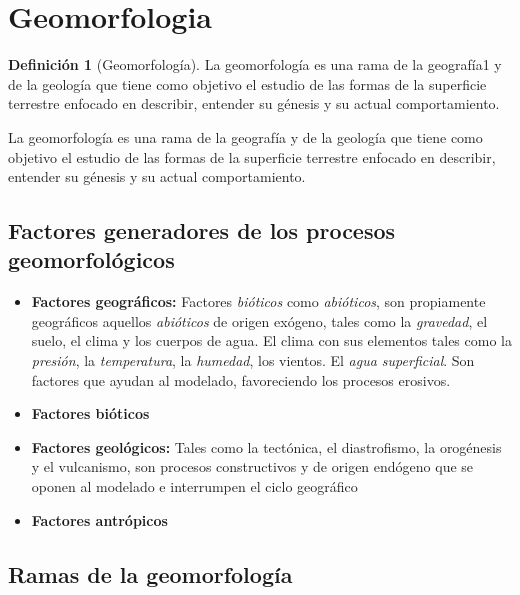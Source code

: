 \documentclass[16pt,]{krantz}
\providecommand{\tightlist}{%
  \setlength{\itemsep}{0pt}\setlength{\parskip}{0pt}}
\theoremstyle{definition}
\newtheorem{definition}{Definición}[chapter]
\theoremstyle{definition}
\theoremstyle{definition}
\theoremstyle{definition}
\theoremstyle{remark}
\begin{document}
\hypertarget{geomorfologia}{%
\section{Geomorfologia}\label{geomorfologia}}

\begin{definition}[Geomorfología]
\protect\hypertarget{def:www2}{}{\label{def:www2} {} }La geomorfología es una rama de la geografía1 y de la geología que tiene como objetivo el estudio de las formas de la superficie terrestre enfocado en describir, entender su génesis y su actual comportamiento.
\end{definition}
La geomorfología es una rama de la geografía y de la geología que tiene como objetivo el estudio de las formas de la superficie terrestre enfocado en describir, entender su génesis y su actual comportamiento.

\hypertarget{factores-generadores-de-los-procesos-geomorfoluxf3gicos}{%
\subsection{Factores generadores de los procesos geomorfológicos}\label{factores-generadores-de-los-procesos-geomorfoluxf3gicos}}

\begin{itemize}
\tightlist
\item
  \textbf{Factores geográficos:} Factores \emph{bióticos} como \emph{abióticos}, son propiamente geográficos aquellos \emph{abióticos} de origen exógeno, tales como la \emph{gravedad}, el suelo, el clima y los cuerpos de agua. El clima con sus elementos tales como la \emph{presión}, la \emph{temperatura}, la \emph{humedad}, los vientos. El \emph{agua superficial}. Son factores que ayudan al modelado, favoreciendo los procesos erosivos.
\item
  \textbf{Factores bióticos}
\item
  \textbf{Factores geológicos:} Tales como la tectónica, el diastrofismo, la orogénesis y el vulcanismo, son procesos constructivos y de origen endógeno que se oponen al modelado e interrumpen el ciclo geográfico
\item
  \textbf{Factores antrópicos}
\end{itemize}

\hypertarget{ramas-de-la-geomorfologuxeda}{%
\subsection{Ramas de la geomorfología}\label{ramas-de-la-geomorfologuxeda}}
\end{document}
